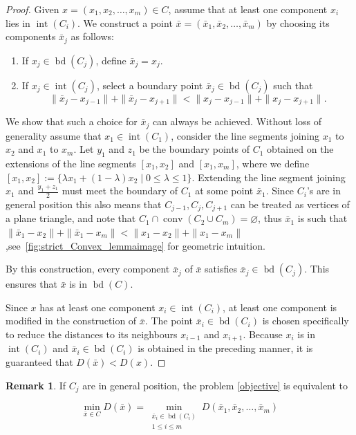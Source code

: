 \documentclass[12pt]{article}
\theoremstyle{plain}
\theoremstyle{definition}
\newtheorem{remark}[theorem]{Remark}
\newcommand{\bd}{\operatorname{bd}}
\newcommand{\interior}{\operatorname{int}}
\begin{document}
\begin{proof}
	Given \(x = (x_1,x_2,\dots,x_m)\in C\), assume that at least one component \(x_i\) lies in \(\interior(C_i)\). We construct a point \(\bar{x} = (\bar{x}_1, \bar{x}_2, \dots, \bar{x}_m)\) by choosing its components \(\bar{x}_j\) as follows:
	\begin{enumerate}
		\item If \( x_j \in \bd(C_j) \), define \(\bar{x}_j = x_j\).
		\item If \( x_j \in \interior(C_j) \), select a boundary point \(\bar{x}_j \in \bd(C_j)\) such that
		\[
		\| \bar{x}_j - x_{j-1} \| + \|\bar{x}_j - x_{j+1} \| < \|x_j - x_{j-1} \| + \|x_j - x_{j+1} \|.
		\]
	\end{enumerate}
	We show that such a choice for \(\bar{x}_j\) can always be achieved. Without loss of generality assume that $x_1 \in \interior(C_1)$, consider the line segments joining $x_1$ to $x_2$ and $x_1$ to $x_m$. Let $y_1$ and $z_1$ be the boundary points of $C_1$ obtained on the extensions of the line segments $[x_1, x_2]$ and $[x_1, x_m]$, where we define \([x_1,x_2] := \{\lambda x_1 + (1-\lambda)x_2 \mid 0 \le \lambda \le 1\}\). Extending the line segment joining $x_1$ and $\frac{y_1+z_1}{2}$ must meet the boundary of $C_1$ at some point $\bar{x}_1$. Since $C_i$'s are in general position this also means that $C_{j-1}, C_j, C_{j+1}$ can be treated as vertices of a plane triangle, and note that $C_1 \cap \operatorname{conv}(C_2 \cup C_m)= \varnothing$, thus 	
	$\bar{x}_1$ is such that $\| \bar{x}_1 - x_{2} \|  + \|\bar{x}_1 - x_{m} \|< \|x_1 - x_{2} \| +\|x_1 - x_{m} \|$ ,see~\ref{fig:strict_Convex_lemmaimage} for geometric intuition.
	
	By this construction, every component \(\bar{x}_j\) of \(\bar{x}\) satisfies \(\bar{x}_j \in \bd(C_j)\). This ensures that \(\bar{x}\) is in $\bd(C)$.
	
	Since \(x\) has at least one component \(x_i \in \interior(C_i)\), at least one component is modified in the construction of \(\bar{x}\). The point \(\bar{x}_i \in \bd(C_i)\) is chosen specifically to reduce the distances to its neighbours \(x_{i-1}\) and \(x_{i+1}\). Because \(x_i\) is in \(\interior(C_i)\) and \(\bar{x}_i \in \bd(C_i)\) is obtained in the preceding manner, it is guaranteed that \(D(\bar{x}) < D(x)\).
\end{proof}%





\begin{remark}\label{Boundary_Remark}
If $C_j$ are in general position, the problem \eqref{objective}  is equivalent to
	
	\begin{equation}\label{Boundary_Objective}
		\min_{\bar{x} \in C} D(\bar{x}) 
		= \min_{\substack{\bar{x}_i \in \bd(C_i) \\ 1 \leq i \leq m}} D(\bar{x}_1, \bar{x}_2, \dots, \bar{x}_m)
	\end{equation}
\end{remark}
\end{document}

